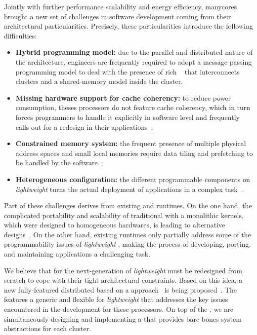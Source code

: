 	Jointly with further performance scalability and energy efficiency, manycores brought a new
	set of challenges in software development coming from their architectural particularities.
	Precisely, these particularities introduce the following difficulties:
	\begin{itemize}
		\item \textbf{Hybrid programming model:} due to the parallel and distributed nature of
			the architecture, engineers are frequently required to adopt a message-passing
			programming model to deal with the presence of rich \nocs~\cite{kelly2013} that
			interconnects clusters and a shared-memory model inside the cluster.
		\item \textbf{Missing hardware support for cache coherency:} to reduce power consumption,
			theses processors do not feature cache coherency, which in turn forces programmers to
			handle it explicitly in software level and frequently calls out for a redesign in their
			applications~\cite{francesquini2015};
		\item \textbf{Constrained memory system:} the frequent presence of multiple physical
			address spaces and small local memories require data tiling and prefetching to be
			handled by the software~\cite{Castro2016};
		\item \textbf{Heterogeneous configuration:} the different programmable components on
			\textit{lightweight} \manycores turns the actual deployment of applications in a
			complex task~\cite{barbalace2015}.
	\end{itemize}

	Part of these challenges derives from existing \oses and runtimes.
	On the one hand, the complicated portability and scalability of traditional \oses with a
	monolithic kernels, which were designed to homogeneous hardwares, is leading to alternative
	\os designs~\cite{Baumann2009, kluge2014, nightingale2009, rhoden2011}.
	On the other hand, existing runtimes only partially address some of the programmability issues
	of \textit{lightweight} \manycores, making the process of developing, porting, and maintaining
	applications a challenging task.

	We believe that \oses for the next-generation of \textit{lightweight} \manycores must be
	redesigned from scratch to cope with their tight architectural constraints.
	Based on this idea, a new fully-featured distributed \os based on a \multikernel approach~\cite{Baumann2009}
	is being proposed~\cite{penna2017-1,penna2017-2,penna2019}.
	The \nanvix \microkernel features a generic and flexible \hal for \textit{lightweight} \manycores that
	addresses the key issues encountered in the development for these processors.
	On top of the \nanvix \hal, we are simultaneously designing and implementing a \microkernel
	that provides bare bones system abstractions for each cluster.

